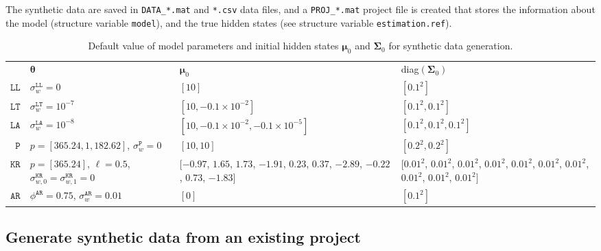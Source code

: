 The synthetic data are saved in \lstinline[basicstyle = \mlttfamily \small, backgroundcolor = \color{light-gray}]!DATA_*.mat! and \lstinline[basicstyle = \mlttfamily \small, backgroundcolor = \color{light-gray}]!*.csv! data files, and a \lstinline[basicstyle = \mlttfamily \small, backgroundcolor = \color{light-gray}]!PROJ_*.mat! project file is created that stores the information about the model (structure variable \lstinline[basicstyle = \mlttfamily \small, backgroundcolor = \color{light-gray}]!model!), and the true hidden states (see structure variable \lstinline[basicstyle = \mlttfamily \small, backgroundcolor = \color{light-gray}]!estimation.ref!).





\begin{table}[h]
     \caption{Default value of model parameters and initial hidden states $\bm{\mu}_{0}$ and $\mathbf{\Sigma}_{0}$ for synthetic data generation.} 
     \centering
     \begin{tabular}{r|lp{3.1cm}p{4cm}}\toprule
        & $\bm{\theta}$ & $\bm{\mu}_{0}$ & diag$(\mathbf{\Sigma}_{0})$ \\\cmidrule(lr){1-4}
    $\mathtt{LL}$   &  $\sigma_{w}^{\mathtt{LL}}=0$ &$[10]$ & $[0.1^{2}]$ \\
    $\mathtt{LT}$    & $\sigma_{w}^{\mathtt{LT}}=10^{-7}$ &  $[10, -0.1\times10^{-2}]$ & $[0.1^{2}, 0.1^{2}]$ \\
     $\mathtt{LA}$   & $\sigma_{w}^{\mathtt{LA}}=10^{-8}$  &  $[10, -0.1\times10^{-2} , -0.1\times10^{-5}]$ & $[0.1^{2}, 0.1^{2}, 0.1^{2}]$ \\
     $\mathtt{P}$  &  $p=[365.24, 1, 182.62] $, $\sigma_{w}^{\mathtt{P}}=0$  &$[10, 10]$ & $[0.2^{2}, 0.2^{2}]$  \\
     $\mathtt{KR}$  & $p=[365.24]$, $\ell=0.5$, $\sigma_{w,0}^{\mathtt{KR}}=\sigma_{w,1}^{\mathtt{KR}}=0$ &  $[$$-0.97$, $1.65$, $1.73$, $-1.91$, $0.23$, $0.37$, $-2.89$, $-0.22$, $0.73$, $-1.83$$]$ & $[$$0.01^{2}$, $0.01^{2}$, $0.01^{2}$, $0.01^{2}$, $0.01^{2}$, $0.01^{2}$, $0.01^{2}$, $0.01^{2}$, $0.01^{2}$, $0.01^{2}$$]$  \\  
         $\mathtt{AR}$   &  $\phi^{\mathtt{AR}}=0.75$, $\sigma_{w}^{\mathtt{AR}}=0.01$  &$[0]$ & $[0.1^{2}]$ \\\bottomrule
     \end{tabular}
\label{table:defaultsynthetic}
\end{table}

\subsection{Generate synthetic data from an existing project}




